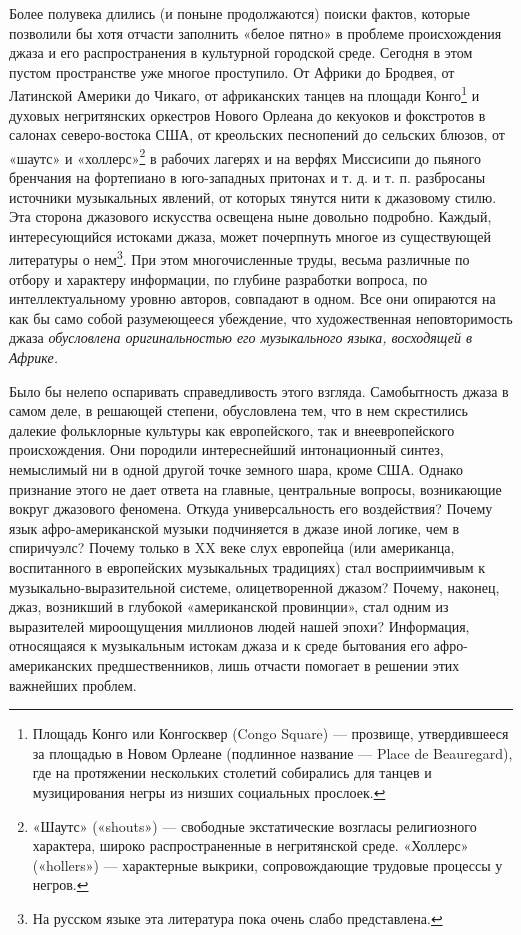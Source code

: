 Более  полувека   длились  (и  поныне  продолжаются)   поиски  фактов,
которые  позволили   бы  хотя   отчасти  заполнить  «белое   пятно»  в
проблеме  происхождения  джаза  и  его  распространения  в  культурной
городской  среде.  Сегодня  в  этом  пустом  пространстве  уже  многое
проступило.  От Африки  до Бродвея,  от Латинской  Америки до  Чикаго,
от  африканских танцев  на  площади  Конго\footnote{Площадь Конго  или
Конгосквер  (Congo  Square)  —  прозвище,  утвердившееся  за  площадью
в  Новом   Орлеане  (подлинное   название  —  Place   de  Beauregard),
где  на  протяжении  нескольких   столетий  собирались  для  танцев  и
музицирования  негры   из  низших  социальных  прослоек.}   и  духовых
негритянских  оркестров  Нового Орлеана  до  кекуоков  и фокстротов  в
салонах  северо-востока  США,  от креольских  песнопений  до  сельских
блюзов, от «шаутс» и «холлерс»\footnote{«Шаутс» («shouts») — свободные
экстатические возгласы религиозного характера, широко распространенные
в  негритянской среде.  «Холлерс» («hollers»)  — характерные  выкрики,
сопровождающие трудовые  процессы у  негров.} в  рабочих лагерях  и на
верфях  Миссисипи до  пьяного бренчания  на фортепиано  в юго-западных
притонах и  т. д.  и т. п.  разбросаны источники  музыкальных явлений,
от  которых тянутся  нити  к джазовому  стилю.  Эта сторона  джазового
искусства  освещена  ныне  довольно подробно.  Каждый,  интересующийся
истоками  джаза, может  почерпнуть многое  из существующей  литературы
о  нем\footnote{На  русском  языке  эта литература  пока  очень  слабо
представлена.}.  При  этом   многочисленные  труды,  весьма  различные
по  отбору  и характеру  информации,  по  глубине разработки  вопроса,
по  интеллектуальному  уровню  авторов,  совпадают в  одном.  Все  они
опираются   на  как   бы  само   собой  разумеющееся   убеждение,  что
художественная неповторимость  джаза \emph{обусловлена оригинальностью
его музыкального языка, восходящей в Африке.}

Было бы  нелепо оспаривать справедливость этого  взгляда. Самобытность
джаза  в  самом  деле,  в   решающей  степени,  обусловлена  тем,  что
в  нем  скрестились  далекие фольклорные  культуры  как  европейского,
так  и  внеевропейского   происхождения.  Они  породили  интереснейший
интонационный  синтез,  немыслимый ни  в  одной  другой точке  земного
шара, кроме  США. Однако  признание этого не  дает ответа  на главные,
центральные  вопросы, возникающие  вокруг  джазового феномена.  Откуда
универсальность его воздействия?  Почему язык афро-американской музыки
подчиняется в джазе иной логике, чем  в спиричуэлс? Почему только в XX
веке  слух  европейца  (или  американца,  воспитанного  в  европейских
музыкальных традициях)  стал восприимчивым  к музыкально-выразительной
системе,  олицетворенной  джазом?  Почему,  наконец,  джаз,  возникший
в  глубокой  «американской  провинции»,   стал  одним  из  выразителей
мироощущения миллионов  людей нашей  эпохи? Информация,  относящаяся к
музыкальным истокам  джаза и  к среде бытования  его афро-американских
предшественников,  лишь  отчасти  помогает в  решении  этих  важнейших
проблем.

